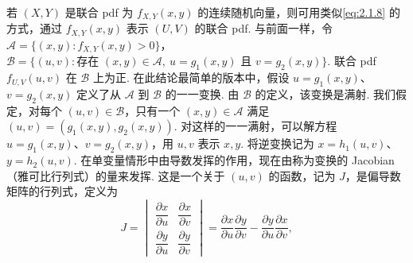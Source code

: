若 $(X,Y)$ 是联合 pdf 为 $f_{X,Y}(x,y)$ 的连续随机向量，则可用类似\eqref{eq:2.1.8} 的方式，通过 $f_{X,Y}(x,y)$ 表示 $(U,V)$ 的联合 pdf. 与前面一样，令 $\mathscr A=\{(x,y):f_{X,Y}(x,y)>0\}$，$\mathscr B=\{(u,v):\text{存在 }(x,y)\in\mathscr A,\ u=g_1(x,y)\text{ 且 }v=g_2(x,y)\}$. 联合 pdf $f_{U,V}(u,v)$ 在 $\mathscr B$ 上为正. 在此结论最简单的版本中，假设 $u=g_1(x,y)$、$v=g_2(x,y)$ 定义了从 $\mathscr A$ 到 $\mathscr B$ 的一一变换. 由 $\mathscr B$ 的定义，该变换是满射. 我们假定，对每个 $(u,v)\in\mathscr B$，只有一个 $(x,y)\in\mathscr A$ 满足 $(u,v)=(g_1(x,y),g_2(x,y))$. 对这样的一一满射，可以解方程 $u=g_1(x,y)$、$v=g_2(x,y)$，用 $u,v$ 表示 $x,y$. 将逆变换记为 $x=h_1(u,v)$、$y=h_2(u,v)$. 在单变量情形中由导数发挥的作用，现在由称为变换的 Jacobian（雅可比行列式）的量来发挥. 这是一个关于 $(u,v)$ 的函数，记为 $J$，是偏导数矩阵的行列式，定义为
$$J=\begin{vmatrix}\dfrac{\partial x}{\partial u}&\dfrac{\partial x}{\partial v}\\[4pt]\dfrac{\partial y}{\partial u}&\dfrac{\partial y}{\partial v}\end{vmatrix}
=\frac{\partial x}{\partial u}\frac{\partial y}{\partial v}-\frac{\partial y}{\partial u}\frac{\partial x}{\partial v},$$

